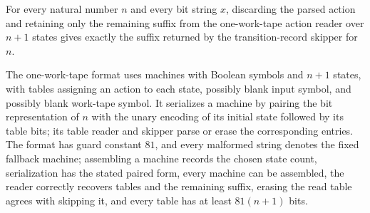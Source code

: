 \begin{lemma}
\label{Turing.codeEraseActionK_one}
\leanok
{}
For every natural number $n$ and every bit string $x$, discarding the parsed action and
retaining only the remaining suffix from the one-work-tape action reader over $n+1$
states gives exactly the suffix returned by the transition-record skipper for $n$.
\end{lemma}

\begin{definition}
\label{Turing.oneTapeFormat}
\leanok
{}
The one-work-tape format uses machines with Boolean symbols and $n+1$ states, with
tables assigning an action to each state, possibly blank input symbol, and possibly
blank work-tape symbol. It serializes a machine by pairing the bit representation of $n$
with the unary encoding of its initial state followed by its table bits; its table
reader and skipper parse or erase the corresponding entries. The format has guard
constant $81$, and every malformed string denotes the fixed fallback machine; assembling
a machine records the chosen state count, serialization has the stated paired form,
every machine can be assembled, the reader correctly recovers tables and the remaining
suffix, erasing the read table agrees with skipping it, and every table has at least
$81(n+1)$ bits.
\end{definition}
